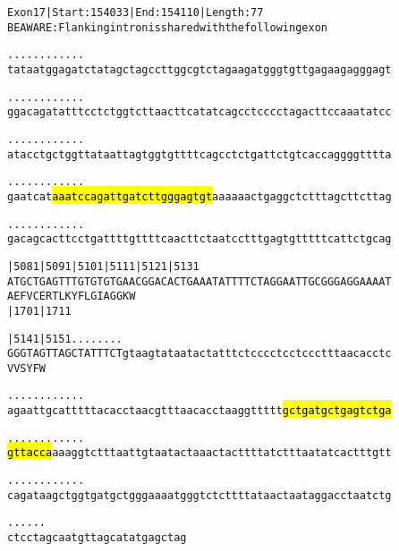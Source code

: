 \documentclass{article}
\begin{document}
\begin{alltt}
Exon 17 | Start: 154033 | End: 154110 | Length: 77
BE AWARE: Flanking intron is shared with the following exon

.    .    .    .    .    .    .    .    .    .    .    .    
tataatggagatctatagctagccttggcgtctagaagatgggtgttgagaagagggagt

.    .    .    .    .    .    .    .    .    .    .    .    
ggacagatatttcctctggtcttaacttcatatcagcctcccctagacttccaaatatcc

.    .    .    .    .    .    .    .    .    .    .    .    
atacctgctggttataattagtggtgttttcagcctctgattctgtcaccaggggtttta

.    .    .    .    .    .    .    .    .    .    .    .    
gaatcat\hl{aaatccagattgatcttgggagtgt}aaaaaactgaggctctttagcttcttag

.    .    .    .    .    .    .    .    .    .    .    .    
gacagcacttcctgattttgttttcaacttctaatcctttgagtgtttttcattctgcag

      |5081     |5091     |5101     |5111     |5121     |5131
ATGCTGAGTTTGTGTGTGAACGGACACTGAAATATTTTCTAGGAATTGCGGGAGGAAAAT
  A  E  F  V  C  E  R  T  L  K  Y  F  L  G  I  A  G  G  K  W
                          |1701                         |1711

      |5141     |5151 .    .    .    .    .    .    .    .  
GGGTAGTTAGCTATTTCTgtaagtataatactatttctcccctcctccctttaacacctc
  V  V  S  Y  F  W                                          

  .    .    .    .    .    .    .    .    .    .    .    .  
agaattgcatttttacacctaacgtttaacacctaaggttttt\hl{gctgatgctgagtctga}

  .    .    .    .    .    .    .    .    .    .    .    .  
\hl{gttacca}aaaggtctttaattgtaatactaaactacttttatctttaatatcactttgtt

  .    .    .    .    .    .    .    .    .    .    .    .  
cagataagctggtgatgctgggaaaatgggtctcttttataactaataggacctaatctg

  .    .    .    .    .    .
ctcctagcaatgttagcatatgagctag
\end{alltt}
\newpage
\end{document}
